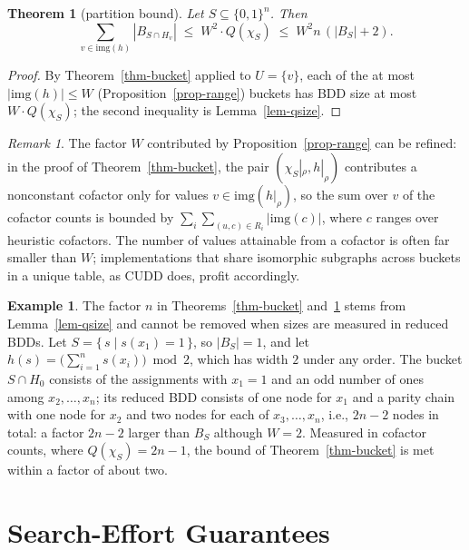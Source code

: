 \documentclass[letterpaper]{article}
\newcommand{\bdd}[1]{\ensuremath{B_{#1}}}
\newcommand{\bddsize}[1]{\ensuremath{|B_{#1}|}}
\newcommand{\cofcount}{\ensuremath{Q}}
\newcommand{\level}[2]{\ensuremath{H_{#2}}}
\newcommand{\img}{\ensuremath{\mathrm{img}}}
\theoremstyle{plain}
\newtheorem{theorem}{Theorem}
\theoremstyle{definition}
\newtheorem{example}{Example}
\theoremstyle{remark}
\newtheorem{remark}{Remark}
\begin{document}
\begin{theorem}[partition bound]
\label{thm-partition}
Let $S \subseteq \{0,1\}^n$. Then
\[
\sum_{v \in \img(h)} \bddsize{S \cap \level{h}{v}}
\;\leq\; W^{2} \cdot \cofcount(\chi_S)
\;\leq\; W^{2} n \, (\bddsize{S} + 2).
\]
\end{theorem}

\begin{proof}
By Theorem~\ref{thm-bucket} applied to $U = \{v\}$, each of the at most
$|\img(h)| \leq W$ (Proposition~\ref{prop-range}) buckets has BDD size
at most $W \cdot \cofcount(\chi_S)$; the second inequality is
Lemma~\ref{lem-qsize}.
\end{proof}

\begin{remark}
The factor $W$ contributed by Proposition~\ref{prop-range} can be
refined: in the proof of Theorem~\ref{thm-bucket}, the pair
$(\chi_S|_\rho, h|_\rho)$ contributes a nonconstant cofactor only for
values $v \in \img(h|_\rho)$, so the sum over $v$ of the cofactor counts
is bounded by
$\sum_{i} \sum_{(u,c) \in R_i} |\img(c)|$, where $c$ ranges over
heuristic cofactors. The number of values attainable from a cofactor is
often far smaller than $W$; implementations that share isomorphic
subgraphs across buckets in a unique table, as CUDD does, profit
accordingly.
\end{remark}

\begin{example}
\label{ex-parity}
The factor $n$ in Theorems~\ref{thm-bucket} and~\ref{thm-partition}
stems from Lemma~\ref{lem-qsize} and cannot be removed when sizes are
measured in reduced BDDs. Let $S = \{\, s \mid s(x_1) = 1 \,\}$, so
$\bddsize{S} = 1$, and let $h(s) = \bigl(\sum_{i=1}^{n} s(x_i)\bigr)
\bmod 2$, which has width $2$ under any order. The bucket
$S \cap \level{h}{0}$ consists of the assignments with $x_1 = 1$ and an
odd number of ones among $x_2, \dots, x_n$; its reduced BDD consists of
one node for $x_1$ and a parity chain with one node for $x_2$ and two
nodes for each of $x_3, \dots, x_n$, i.e., $2n - 2$ nodes in total: a
factor $2n - 2$ larger than $\bdd{S}$ although $W = 2$. Measured in
cofactor counts, where $\cofcount(\chi_S) = 2n - 1$, the bound of
Theorem~\ref{thm-bucket} is met within a factor of about two.
\end{example}

\section{Search-Effort Guarantees}
\label{sec-effort}
\end{document}
